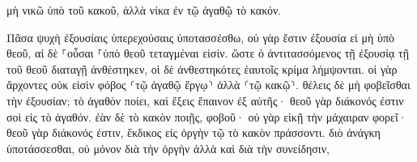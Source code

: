 \documentclass{openreader}
\begin{document}
μὴ νικῶ ὑπὸ τοῦ κακοῦ, ἀλλὰ νίκα ἐν τῷ ἀγαθῷ τὸ κακόν. 

Πᾶσα ψυχὴ ἐξουσίαις ὑπερεχούσαις ὑποτασσέσθω, οὐ γὰρ ἔστιν ἐξουσία εἰ μὴ ὑπὸ θεοῦ, αἱ δὲ ⸀οὖσαι ⸀ὑπὸ θεοῦ τεταγμέναι εἰσίν. 
ὥστε ὁ ἀντιτασσόμενος τῇ ἐξουσίᾳ τῇ τοῦ θεοῦ διαταγῇ ἀνθέστηκεν, οἱ δὲ ἀνθεστηκότες ἑαυτοῖς κρίμα λήμψονται. 
οἱ γὰρ ἄρχοντες οὐκ εἰσὶν φόβος ⸂τῷ ἀγαθῷ ἔργῳ⸃ ἀλλὰ ⸂τῷ κακῷ⸃. θέλεις δὲ μὴ φοβεῖσθαι τὴν ἐξουσίαν; τὸ ἀγαθὸν ποίει, καὶ ἕξεις ἔπαινον ἐξ αὐτῆς· 
θεοῦ γὰρ διάκονός ἐστιν σοὶ εἰς τὸ ἀγαθόν. ἐὰν δὲ τὸ κακὸν ποιῇς, φοβοῦ· οὐ γὰρ εἰκῇ τὴν μάχαιραν φορεῖ· θεοῦ γὰρ διάκονός ἐστιν, ἔκδικος εἰς ὀργὴν τῷ τὸ κακὸν πράσσοντι. 
διὸ ἀνάγκη ὑποτάσσεσθαι, οὐ μόνον διὰ τὴν ὀργὴν ἀλλὰ καὶ διὰ τὴν συνείδησιν, 
\end{document}
